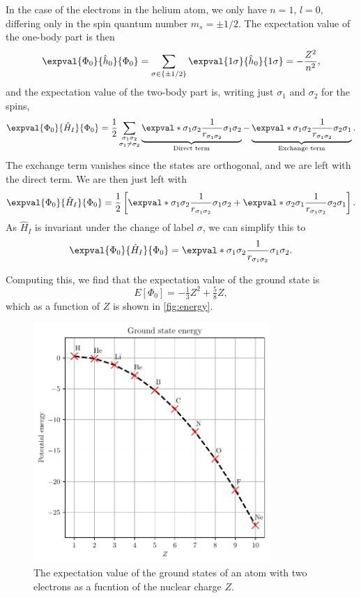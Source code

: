 In the case of the electrons in the helium atom, we only have $n = 1$, $l = 0$, differing only in the spin quantum number $m_s = \pm 1/2$.
The expectation value of the one-body part is then
\begin{equation*}
    \expval{\Phi_0}{\hat{h}_0}{\Phi_0} = \sum_{\sigma \in \{\pm 1/2\}} \expval{1\sigma}{\hat{h}_0}{1\sigma} = -\frac{Z^2}{n^2},
\end{equation*}
and the expectation value of the two-body part is, writing just $\sigma_1$ and $\sigma_2$ for the spins,
\begin{equation*}
    \expval{\Phi_0}{\hat{H}_I}{\Phi_0}
    = \frac{1}{2} \sum_{\substack{\sigma_1\sigma_2\\ \sigma_1 \neq \sigma_2}}
    \underbrace{\expval*{\sigma_1 \sigma_2}{\frac{1}{r_{\sigma_1\sigma_2}}}{\sigma_1 \sigma_2}}_{\textnormal{Direct term}}
    - \underbrace{\expval*{\sigma_1 \sigma_2}{\frac{1}{r_{\sigma_1\sigma_2}}}{\sigma_2\sigma_1}}_{\textnormal{Exchange term}}.
\end{equation*}
The exchange term vanishes since the states are orthogonal, and we are left with the direct term.
We are then just left with
\begin{equation*}
    \expval{\Phi_0}{\hat{H}_I}{\Phi_0} = \frac{1}{2}\left[ \expval*{\sigma_1 \sigma_2}{\frac{1}{r_{\sigma_1 \sigma_2}}}{\sigma_1 \sigma_2} + \expval*{\sigma_2 \sigma_1}{\frac{1}{r_{\sigma_1 \sigma_2}}}{\sigma_2 \sigma_1}\right].
\end{equation*}
As $\hat{H}_I$ is invariant under the change of label $\sigma$, we can simplify this to
\begin{equation*}
    \expval{\Phi_0}{\hat{H}_I}{\Phi_0} = \expval*{\sigma_1 \sigma_2}{\frac{1}{r_{\sigma_1 \sigma_2}}}{\sigma_1 \sigma_2}.
\end{equation*}

Computing this, we find that the expectation value of the ground state is
\begin{equation}
    E[\Phi_0] = -\tfrac{1}{3}Z^2 + \tfrac{5}{8}Z,
\end{equation}
which as a function of $Z$ is shown in \autoref{fig:energy}.

\begin{figure}
    \centering
    \includegraphics[width=0.8\textwidth]{figs/energy_plot.pdf}
    \caption{The expectation value of the ground states of an atom with two electrons as a fucntion of the nuclear charge $Z$.\label{fig:energy}}
\end{figure}
